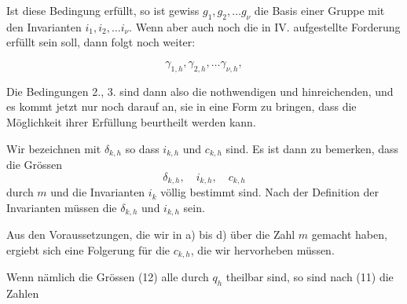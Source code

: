 Ist diese Bedingung erfüllt, so ist gewiss $g_1, g_2, \dots g_\nu$ die Basis einer Gruppe mit den Invarianten $i_1, i_2, \dots i_\nu$. Wenn aber auch noch die in IV. aufgestellte Forderung erfüllt sein soll, dann folgt noch weiter:

\[
\gamma_{1,h}, \gamma_{2,h}, \dots \gamma_{\nu,h},
\]

Die Bedingungen 2., 3. sind dann also die nothwendigen und hinreichenden, und es kommt jetzt nur noch darauf an, sie in eine Form zu bringen, dass die Möglichkeit ihrer Erfüllung beurtheilt werden kann.

Wir bezeichnen mit $\delta_{k,h}$ 
so dass $i_{k,h}$ und $c_{k,h}$  sind. Es ist dann zu bemerken, dass die Grössen
\[
\delta_{k,h}, \quad i_{k,h}, \quad c_{k,h}
\]
durch $m$ und die Invarianten $i_k$ völlig bestimmt sind. Nach der Definition der Invarianten müssen die $\delta_{k,h}$ und $i_{k,h}$  sein.

Aus den Voraussetzungen, die wir in a) bis d) über die Zahl $m$ gemacht haben, ergiebt sich eine Folgerung für die $c_{k,h}$, die wir hervorheben müssen.


Wenn nämlich die Grössen (12) alle durch $q_h$ theilbar sind, so sind nach (11) die Zahlen
